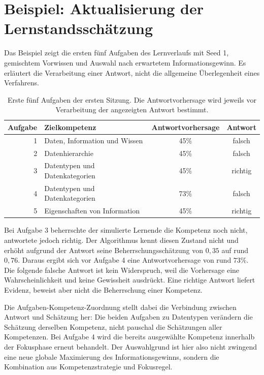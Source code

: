 \section{Beispiel: Aktualisierung der Lernstandsschätzung}
\label{sec:exemplarischer-ablauf}

Das Beispiel zeigt die ersten fünf Aufgaben des Lernverlaufs mit Seed 1,
gemischtem Vorwissen und Auswahl nach erwartetem Informationsgewinn.
Es erläutert die Verarbeitung einer Antwort, nicht die allgemeine
Überlegenheit eines Verfahrens.

\begin{table}[htbp]
  \centering
  \small
  \begin{tabular}{rp{6cm}cc}
    \hline
    Aufgabe & Zielkompetenz & Antwortvorhersage & Antwort \\
    \hline
    1 & Daten, Information und Wissen & 45\% & falsch \\
    2 & Datenhierarchie & 45\% & falsch \\
    3 & Datentypen und Datenkategorien & 45\% & richtig \\
    4 & Datentypen und Datenkategorien & 73\% & falsch \\
    5 & Eigenschaften von Information & 45\% & richtig \\
    \hline
  \end{tabular}
  \caption{Erste fünf Aufgaben der ersten Sitzung. Die Antwortvorhersage
    wird jeweils vor Verarbeitung der angezeigten Antwort bestimmt.}
  \label{tab:beispiel-sitzung}
\end{table}

Bei Aufgabe 3 beherrschte der simulierte Lernende die Kompetenz noch
nicht, antwortete jedoch richtig. Der Algorithmus kennt diesen Zustand
nicht und erhöht aufgrund der Antwort seine Beherrschungsschätzung von
$0{,}35$ auf rund $0{,}76$. Daraus ergibt sich vor Aufgabe 4 eine
Antwortvorhersage von rund $73\%$. Die folgende falsche Antwort ist kein
Widerspruch, weil die Vorhersage eine Wahrscheinlichkeit und keine
Gewissheit ausdrückt. Eine richtige Antwort liefert Evidenz, beweist aber
nicht die Beherrschung einer Kompetenz.

Die Aufgaben-Kompetenz-Zuordnung stellt dabei die Verbindung zwischen
Antwort und Schätzung her: Die beiden Aufgaben zu Datentypen verändern
die Schätzung derselben Kompetenz, nicht pauschal die Schätzungen aller
Kompetenzen. Bei Aufgabe 4 wird die bereits ausgewählte Kompetenz
innerhalb der Fokusphase erneut behandelt. Der Auswahlgrund ist hier
also nicht zwingend eine neue globale Maximierung des Informationsgewinns,
sondern die Kombination aus Kompetenzstrategie und Fokusregel.

